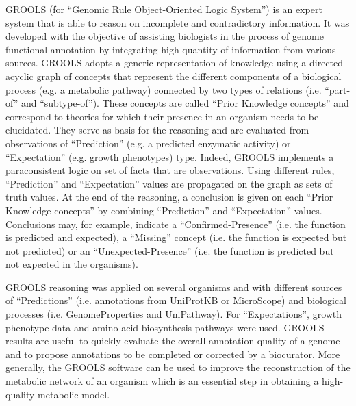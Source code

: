 \documentclass[univ]{thesis}
\begin{document}
\begin{mdframed}[linecolor=psviolet, linewidth=2pt, innerleftmargin=10, innerrightmargin=30, innertopmargin=10, innerbottommargin=50, font=\tiny]
{\begin{multicols}{2}
            GROOLS (for “Genomic Rule Object-Oriented Logic System”) is an expert system that is able to reason on incomplete and contradictory information. It was developed with the objective of assisting biologists in the process of genome functional annotation by integrating high quantity of information from various sources. GROOLS adopts a generic representation of knowledge using a directed acyclic graph of concepts that represent the different components of a biological process (e.g. a metabolic pathway) connected by two types of relations (i.e. “part-of” and “subtype-of”). These concepts are called “Prior Knowledge concepts” and correspond to theories for which their presence in an organism needs to be elucidated. They serve as basis for the reasoning and are evaluated from observations of “Prediction” (e.g. a predicted enzymatic activity) or “Expectation” (e.g. growth phenotypes) type. Indeed, GROOLS implements a paraconsistent logic on set of facts that are observations. Using different rules, “Prediction” and “Expectation” values are propagated on the graph as sets of truth values. At the end of the reasoning, a conclusion is given on each “Prior Knowledge concepts” by combining “Prediction” and “Expectation” values. Conclusions may, for example, indicate a “Confirmed-Presence” (i.e. the function is predicted and expected), a “Missing” concept (i.e. the function is expected but not predicted) or an “Unexpected-Presence” (i.e. the function is predicted but not expected in the organisms).
            
            GROOLS reasoning was applied on several organisms and with different sources of “Predictions” (i.e. annotations from UniProtKB or MicroScope) and biological processes (i.e. GenomeProperties and UniPathway). For “Expectations”, growth phenotype data and amino-acid biosynthesis pathways were used. GROOLS results are useful to quickly evaluate the overall annotation quality of a genome and to propose annotations to be completed or corrected by a biocurator. More generally, the GROOLS software can be used to improve the  reconstruction of the metabolic network of an organism which is an essential step in obtaining a high-quality metabolic model.
        \end{multicols}
    }
    \end{mdframed}
\end{document}
